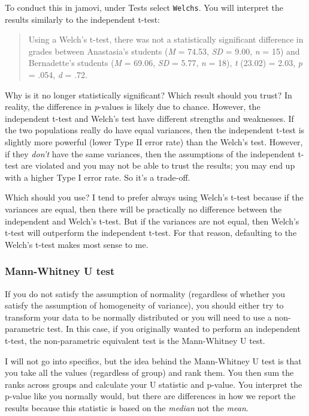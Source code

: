 \documentclass[
]{book}
\begin{document}
To conduct this in jamovi, under Tests select \texttt{Welch\textquotesingle{}s}. You will interpret the results similarly to the independent t-test:

\begin{quote}
Using a Welch's t-test, there was not a statistically significant difference in grades between Anastasia's students (\emph{M} = 74.53, \emph{SD} = 9.00, \emph{n} = 15) and Bernadette's students (\emph{M} = 69.06, \emph{SD} = 5.77, \emph{n} = 18), \emph{t} (23.02) = 2.03, \emph{p} = .054, \emph{d} = .72.
\end{quote}

Why is it no longer statistically significant? Which result should you trust? In reality, the difference in \emph{p}-values is likely due to chance. However, the independent t-test and Welch's test have different strengths and weaknesses. If the two populations really do have equal variances, then the independent t-test is slightly more powerful (lower Type II error rate) than the Welch's test. However, if they \emph{don't} have the same variances, then the assumptions of the independent t-test are violated and you may not be able to trust the results; you may end up with a higher Type I error rate. So it's a trade-off.

Which should you use? I tend to prefer always using Welch's t-test because if the variances are equal, then there will be practically no difference between the independent and Welch's t-test. But if the variances are not equal, then Welch's t-test will outperform the independent t-test. For that reason, defaulting to the Welch's t-test makes most sense to me.

\hypertarget{mann-whitney-u-test}{%
\subsubsection{Mann-Whitney U test}\label{mann-whitney-u-test}}

If you do not satisfy the assumption of normality (regardless of whether you satisfy the assumption of homogeneity of variance), you should either try to transform your data to be normally distributed or you will need to use a non-parametric test. In this case, if you originally wanted to perform an independent t-test, the non-parametric equivalent test is the Mann-Whitney U test.

I will not go into specifics, but the idea behind the Mann-Whitney U test is that you take all the values (regardless of group) and rank them. You then sum the ranks across groups and calculate your U statistic and p-value. You interpret the p-value like you normally would, but there are differences in how we report the results because this statistic is based on the \emph{median} not the \emph{mean}.
\end{document}
